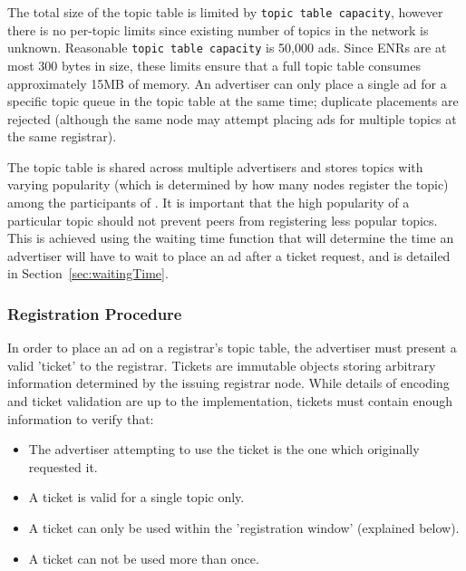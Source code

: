 The total size of the topic table is limited by \texttt{topic table capacity},  however there is no per-topic limits since existing number of topics in the network is unknown. 
Reasonable \texttt{topic table capacity} is 50,000 ads. 
Since ENRs are at most 300 bytes in size, these limits ensure that a full topic table consumes approximately 15MB of memory.
An advertiser can only place a single ad for a specific topic queue in the topic table at the same time; duplicate placements are rejected (although the same node may attempt placing ads for multiple topics at the same registrar).

The topic table is shared across multiple advertisers and stores topics with varying popularity (which is determined by how many nodes register the topic) among the participants of \sysname. 
It is important that the high popularity of a particular topic should not prevent peers from registering less popular topics. 
This is achieved using the waiting time function that will determine the time an advertiser will have to wait to place an ad after a ticket request,  and is detailed in Section~\ref{sec:waitingTime}.

\subsubsection{Registration Procedure}

In order to place an ad on a registrar's topic table,  the advertiser must present a valid 'ticket' to the registrar. 
Tickets are immutable objects storing arbitrary information determined by the issuing registrar node.  While details of encoding and ticket validation are up to the implementation, tickets must contain enough information to verify that:
\begin{itemize}
    \item The advertiser attempting to use the ticket is the one which originally requested it.
    \item A ticket is valid for a single topic only.
    \item A ticket can only be used within the 'registration window' (explained below).
    \item A ticket can not be used more than once.
\end{itemize}

